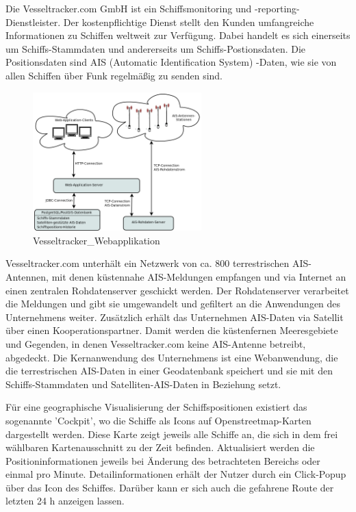 Die Vesseltracker.com GmbH ist ein Schiffsmonitoring und -reporting-Dienstleister. Der kostenpflichtige Dienst stellt den Kunden umfangreiche Informationen zu Schiffen weltweit zur Verfügung. Dabei handelt es sich einerseits um Schiffs-Stammdaten und andererseits um Schiffs-Postionsdaten. Die Positionsdaten sind AIS (Automatic Identification System) -Daten, wie sie von allen Schiffen über Funk regelmäßig zu senden sind.

\begin{figure}
  \begin{center}
    \includegraphics[width=0.58\textwidth]{images/Exposee_graphik_Webapp}
  \end{center}
  \caption{Vesseltracker\_Webapplikation}
\end{figure}

Vesseltracker.com unterhält ein Netzwerk von ca. 800 terrestrischen AIS-Antennen, mit denen küstennahe AIS-Meldungen empfangen und via Internet an einen zentralen Rohdatenserver geschickt werden. Der Rohdatenserver verarbeitet die Meldungen und gibt sie umgewandelt und gefiltert an die Anwendungen des Unternehmens weiter.
Zusätzlich erhält das Unternehmen AIS-Daten via Satellit über einen Kooperationspartner. Damit werden die küstenfernen Meeresgebiete und Gegenden, in denen Vesseltracker.com keine AIS-Antenne betreibt, abgedeckt.
Die Kernanwendung des Unternehmens ist eine Webanwendung, die die terrestrischen AIS-Daten in einer Geodatenbank speichert und sie mit den Schiffs-Stammdaten und Satelliten-AIS-Daten in Beziehung setzt.

Für eine geographische Visualisierung der Schiffspositionen existiert das sogenannte 'Cockpit', wo die Schiffe als Icons auf Openstreetmap-Karten dargestellt werden. Diese Karte zeigt jeweils alle Schiffe an, die sich in dem frei wählbaren Kartenausschnitt zu der Zeit befinden. Aktualisiert werden die Positioninformationen jeweils bei Änderung des betrachteten Bereichs  oder einmal pro Minute. Detailinformationen erhält der Nutzer durch ein Click-Popup über das Icon des Schiffes. Darüber kann er sich auch die gefahrene Route der letzten 24 h anzeigen lassen.


